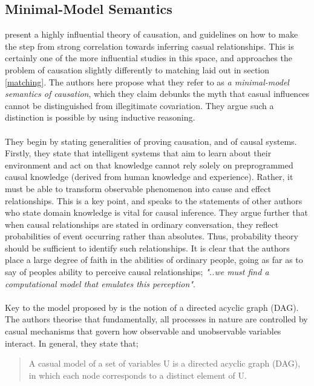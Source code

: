 \subsection{Minimal-Model Semantics}
{\cite{pearl1995theory} present a highly influential theory of causation, and guidelines on how to make the step from strong correlation towards inferring casual relationships. This is certainly one of the more influential studies in this space, and approaches the problem of causation slightly differently to matching laid out in section \ref{matching}. The authors here propose what they refer to as {\it a minimal-model semantics of causation}, which they claim debunks the myth that casual influences cannot be distinguished from illegitimate covariation. They argue such a distinction is possible by using inductive reasoning.\\\\
They begin by stating generalities of proving causation, and of causal systems. Firstly, they state that intelligent systems that aim to learn about their environment and act on that knowledge cannot rely solely on preprogrammed causal knowledge (derived from human knowledge and experience). Rather, it must be able to transform observable phenomenon into cause and effect relationships. This is a key point, and speaks to the statements of other authors who state domain knowledge is vital for causal inference. They argue further that when causal relationships are stated in ordinary conversation, they reflect probabilities of event occurring rather than absolutes. Thus, probability theory should be sufficient to identify such relationships. It is clear that the authors place a large degree of faith in the abilities of ordinary people, going as far as to say of peoples ability to perceive causal relationships; {\it "..we must find a computational model that emulates this perception"}.\\\\
Key to the model proposed by \cite{pearl1995theory} is the notion of a directed acyclic graph (DAG). The authors theorise that fundamentally, all processes in nature are controlled by casual mechanisms that govern how observable and unobservable variables interact. In general, they state that;
\begin{quote}
A casual model of a set of variables U is a directed acyclic graph (DAG), in which each node corresponds to a distinct element of U. 


\end{quote}}
